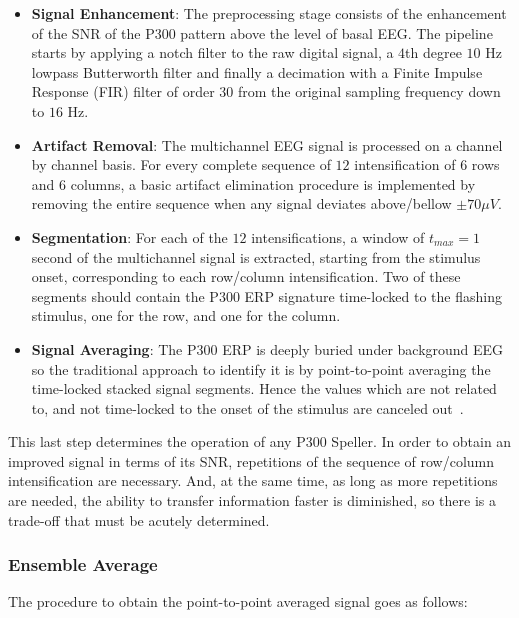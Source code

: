 \documentclass[utf8]{frontiersSCNS} %
\begin{document}
\begin{itemize}
\item \textbf{Signal Enhancement}: The preprocessing stage consists of the enhancement of the SNR of the P300 pattern above the level of basal EEG. The pipeline starts by applying a notch filter to the raw digital signal, a 
$4$th degree $10$ Hz lowpass Butterworth filter and finally a decimation with a Finite Impulse Response (FIR) filter of order $30$ from the original sampling frequency down to $16$ Hz\citep{Krusienski2006}.
\item \textbf{Artifact Removal}: The multichannel EEG signal is processed on a channel by channel basis.   For every complete sequence of $12$ intensification of $6$ rows and $6$ columns, a basic artifact elimination procedure is implemented by removing the entire sequence when any signal deviates above/bellow $ \pm 70 \mu V $.
\item \textbf{Segmentation}: For each of the $12$ intensifications,  a window of $t_{max} = 1$ second of the multichannel signal is extracted, starting from the stimulus onset, corresponding to each row/column intensification.  Two of these segments should contain the P300 ERP signature time-locked to the flashing stimulus, one for the row, and one for the column.
\item \textbf{Signal Averaging}:  The P300 ERP is deeply buried under background EEG so the traditional approach to identify it is by point-to-point averaging the time-locked stacked signal segments.  Hence the values which are not related to, and not time-locked to the onset of the stimulus are canceled out~\citep{Liang2008}. 
\end{itemize}

This last step determines the operation of any P300 Speller.  In order to obtain an improved signal in terms of its SNR, repetitions of the sequence of row/column intensification are necessary.  And, at the same time, as long as more repetitions are needed, the ability to transfer information faster is diminished, so there is a trade-off that must be acutely determined.

\subsubsection{Ensemble Average} \label{Average}

The procedure to obtain the point-to-point averaged signal goes as follows:
\end{document}
